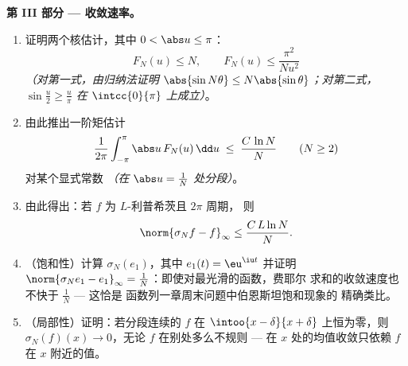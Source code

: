 \begin{problem}
\medskip
\noindent\textbf{第 III 部分 --- 收敛速率。}
\begin{enumerate}[resume]
  \item 证明两个核估计，其中 $0 < \abs u \leq
        \pi$：
        \[
        F_N(u) \leq N,
        \qquad
        F_N(u) \leq \frac{\pi^2}{N u^2}
        \]
        \emph{（对第一式，由归纳法证明 $\abs{\sin N\theta} \leq
        N\abs{\sin\theta}$；对第二式，
        $\sin\frac u2 \geq \frac{u}{\pi}$ 在
        $\intcc{0}{\pi}$ 上成立）}。
  \item 由此推出一阶矩估计
        \[
        \frac{1}{2\pi}\int_{-\pi}^{\pi}\abs u\,F_N(u)\,\dd u
        \;\leq\; \frac{C\,\ln N}{N}
        \qquad (N \geq 2)
        \]
        对某个显式常数 \emph{（在 $\abs u =
        \frac1N$ 处分段）}。
  \item 由此得出：若 $f$ 为 $L$-利普希茨且 $2\pi$ 周期，
        则
        \[
        \norm{\sigma_N f - f}_\infty \leq \frac{C\,L\ln N}{N} .
        \]
  \item （饱和性）计算 $\sigma_N(e_1)$，其中 $e_1(t) =
        \eu^{\iu t}$ 并证明 $\norm{\sigma_Ne_1 - e_1}_\infty
        = \frac1N$：即使对最光滑的函数，费耶尔
        求和的收敛速度也不快于 $\frac1N$ --- 这恰是
        函数列一章周末问题中伯恩斯坦饱和现象的
        精确类比。
  \item （局部性）证明：若分段连续的 $f$
        在 $\intoo{x - \delta}{x + \delta}$ 上恒为零，则
        $\sigma_N(f)(x) \to 0$，无论 $f$ 在别处多么不规则
        --- 在 $x$ 处的均值收敛只依赖 $f$
        在 $x$ 附近的值。
\end{enumerate}


\end{problem}
